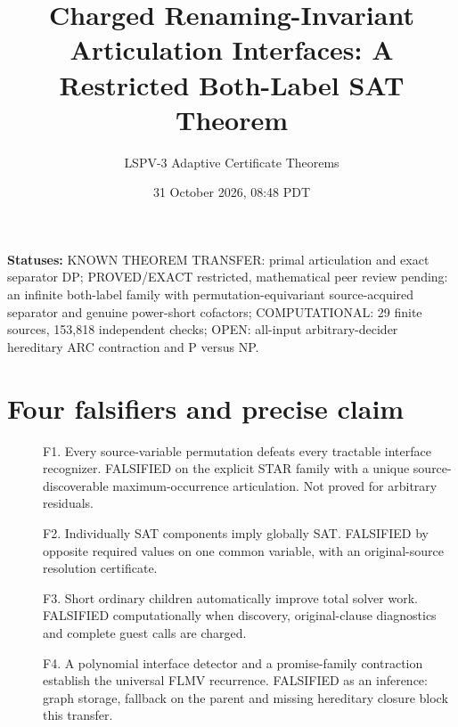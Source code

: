 \documentclass[11pt]{article}
\title{Charged Renaming-Invariant Articulation Interfaces: A Restricted Both-Label SAT Theorem}
\author{LSPV-3 Adaptive Certificate Theorems}
\date{31 October 2026, 08:48 PDT}
\begin{document}
\maketitle
\noindent\textbf{Statuses:} KNOWN THEOREM TRANSFER: primal articulation and exact separator DP; PROVED/EXACT restricted, mathematical peer review pending: an infinite both-label family with permutation-equivariant source-acquired separator and genuine power-short cofactors; COMPUTATIONAL: 29 finite sources, 153,818 independent checks; OPEN: all-input arbitrary-decider hereditary ARC contraction and P versus NP.

\section*{Four falsifiers and precise claim}
\begin{description}
\item[] F1. Every source-variable permutation defeats every tractable interface recognizer. FALSIFIED on the explicit STAR family with a unique source-discoverable maximum-occurrence articulation. Not proved for arbitrary residuals.
\item[] F2. Individually SAT components imply globally SAT. FALSIFIED by opposite required values on one common variable, with an original-source resolution certificate.
\item[] F3. Short ordinary children automatically improve total solver work. FALSIFIED computationally when discovery, original-clause diagnostics and complete guest calls are charged.
\item[] F4. A polynomial interface detector and a promise-family contraction establish the universal FLMV recurrence. FALSIFIED as an inference: graph storage, fallback on the parent and missing hereditary closure block this transfer.
\end{description}
\end{document}
